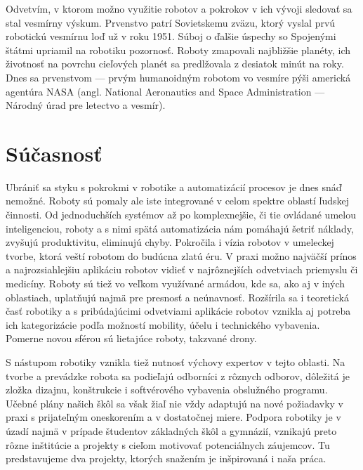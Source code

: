 Odvetvím, v ktorom možno využitie robotov a pokrokov v ich vývoji sledovať sa stal vesmírny výskum. Prvenstvo patrí Sovietskemu zväzu, ktorý vyslal prvú robotickú vesmírnu loď už v roku 1951. Súboj o ďalšie úspechy so Spojenými štátmi upriamil na robotiku pozornosť. Roboty zmapovali najbližšie planéty, ich životnosť na povrchu cieľových planét sa predlžovala z desiatok minút na roky. Dnes sa prvenstvom --- prvým humanoidným robotom vo vesmíre pýši americká agentúra NASA (angl. National Aeronautics and Space Administration --- Národný úrad pre letectvo a vesmír).

\section{Súčasnosť}
Ubrániť sa styku s pokrokmi v robotike a automatizácií procesov je dnes snáď nemožné. Roboty sú pomaly ale iste integrované v celom spektre oblastí ľudskej činnosti. Od jednoduchších systémov až po komplexnejšie, či tie ovládané umelou inteligenciou, roboty a s nimi spätá automatizácia nám pomáhajú šetriť náklady, zvyšujú produktivitu, eliminujú chyby. Pokročila i vízia robotov v umeleckej tvorbe, ktorá veští robotom do budúcna zlatú éru. V praxi možno najväčší prínos a najrozsiahlejšiu aplikáciu robotov vidieť v najrôznejších odvetviach priemyslu či medicíny. Roboty sú tiež vo veľkom využívané armádou, kde sa, ako aj v iných oblastiach, uplatňujú najmä pre presnosť a neúnavnosť. Rozšírila sa i teoretická časť robotiky a s pribúdajúcimi odvetviami aplikácie robotov vznikla aj potreba ich kategorizácie podľa možností mobility, účelu i technického vybavenia. Pomerne novou sférou sú lietajúce roboty, takzvané drony.

S nástupom robotiky vznikla tiež nutnosť výchovy expertov v tejto oblasti. Na tvorbe a prevádzke robota sa podieľajú odborníci z rôznych odborov, dôležitá je zložka dizajnu, konštrukcie i softvérového vybavenia obslužného programu. Učebné plány našich škôl sa však žiaľ nie vždy adaptujú na nové požiadavky v praxi s prijateľným oneskorením a v dostatočnej miere. Podpora robotiky je v úzadí najmä v prípade študentov základných škôl a gymnázií, vznikajú preto rôzne inštitúcie a projekty s cieľom motivovať potenciálnych záujemcov. Tu predstavujeme dva projekty, ktorých snažením je inšpirovaná i naša práca.

